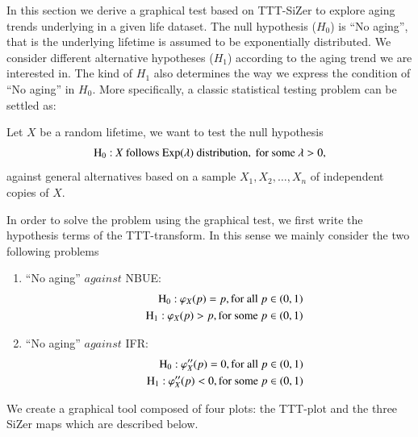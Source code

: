\documentclass[preprint,12pt]{elsarticle}
\begin{document}
\noindent In this section we derive a graphical test based on TTT-SiZer  to explore aging  trends underlying in a given life dataset. The null hypothesis ($H_0$) is ``No aging'', that is the underlying lifetime is assumed to be exponentially distributed. We consider different alternative hypotheses ($H_1$)  according to the aging trend we are interested in. The kind of $H_1$ also determines the way we express the condition of ``No aging'' in $H_0$. More specifically, a classic statistical testing problem can be settled  as:

 \noindent Let $X$ be a random lifetime, we want to test the null hypothesis 
\[
{\rm H_0 :} \ X \ {\rm follows \ Exp}(\lambda) \ {\rm distribution,\ for \ some \ } \lambda >0,
\]
against general alternatives based on a sample $X_1, X_2,\ldots, X_n$ of independent copies of $X$.

In order to solve the problem using the graphical test, we first write the hypothesis terms of the TTT-transform. In this sense we mainly consider the two following problems
\begin{enumerate}

\item ``No aging'' $against$ NBUE:
\begin{eqnarray} \label{test_nbue}
\nonumber &&{\rm H_0 :} \ \varphi_X(p)= p, {\rm for \ all \ } p \in (0,1) \\
&&{\rm H_1 :} \ \varphi_X(p) >  p, {\rm for \ some \ }  p \in (0,1)
\end{eqnarray}


\item ``No aging'' $against$ IFR:
\begin{eqnarray} \label{test_ifr}
\nonumber &&{\rm H_0 :} \ \varphi_X''(p)= 0, {\rm for \ all \ } p \in (0,1) \\
&&{\rm H_1 :} \ \varphi_X''(p) < 0, {\rm for \ some \ }  p \in (0,1)
\end{eqnarray}

\end{enumerate}



We create a graphical tool composed of  four plots: the TTT-plot and the three SiZer maps which are described below.
\end{document}
